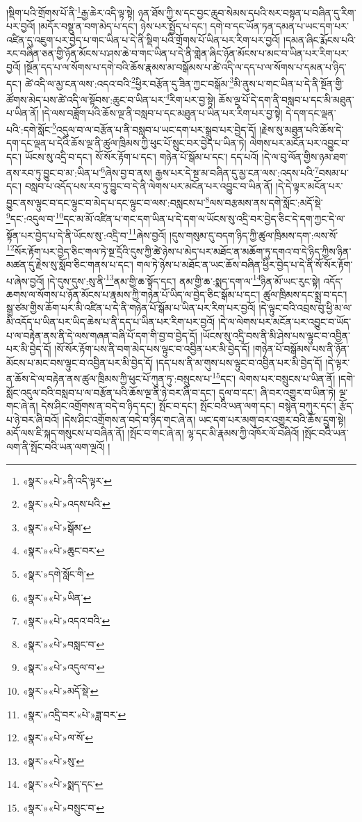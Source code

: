 །སྡིག་པའི་གྲོགས་པོ་ནི་\footnote{«སྣར་»«པེ་»ནི་འདི་ལྟར་}རྒྱ་ཆེར་འདི་ལྟ་སྟེ། ཉན་ཐོས་ཀྱི་ས་དང་བྱང་ཆུབ་སེམས་དཔའི་སར་བསྟན་པ་བཞིན་དུ་རིག་པར་བྱའོ། །མདོར་བསྡུ་ན་བག་མེད་པ་དང་། ཉེས་པར་སྤྱོད་པ་དང་། དགེ་བ་དང་ཡོན་ཏན་དམན་པ་ཡང་དག་པར་འཛིན་དུ་འཇུག་པར་བྱེད་པ་གང་ཡིན་པ་དེ་ནི་སྡིག་པའི་གྲོགས་པོ་ཡིན་པར་རིག་པར་བྱའོ། །དམན་ཞིང་རྨོངས་པའི་རང་བཞིན་ཅན་གྱི་ཉོན་མོངས་པ་ཤས་ཆེ་བ་གང་ཡིན་པ་དེ་ནི་གླེན་ཞིང་ཉོན་མོངས་པ་མང་བ་ཡིན་པར་རིག་པར་བྱའོ། །སྔོན་དད་པ་ལ་སོགས་པ་དགེ་བའི་ཆོས་རྣམས་མ་བསྒོམས་པ་ཚེ་འདི་ལ་དད་པ་ལ་སོགས་པ་དམན་པ་ཉིད་དང་། ཚེ་འདི་ལ་མྱ་ངན་ལས་:འདའ་བའི་\footnote{«སྣར་»«པེ་»འདས་པའི་}ཕྱིར་བརྩོན་དུ་ཟིན་ཀྱང་བསྒོམ་\footnote{«སྣར་»«པེ་»སྒོམ་}མི་ནུས་པ་གང་ཡིན་པ་དེ་ནི་སྔོན་གྱི་ཚོགས་མེད་པས་ཚེ་འདི་ལ་སྟོབས་:ཆུང་བ་ཡིན་པར་\footnote{«སྣར་»«པེ་»ཆུང་བར་}རིག་པར་བྱ་སྟེ། ཆོས་ལྔ་པོ་དེ་དག་ནི་བསླབ་པ་དང་མི་མཐུན་པ་ཡིན་ནོ། །དེ་ལས་བཟློག་པའི་ཆོས་ལྔ་ནི་བསླབ་པ་དང་མཐུན་པ་ཡིན་པར་རིག་པར་བྱ་སྟེ། དེ་དག་དང་ལྡན་པའི་:དགེ་སློང་\footnote{«སྣར་»དགེ་སློང་གི་}འདུལ་བ་ལ་བརྩོན་པ་ནི་བསླབ་པ་ཡང་དག་པར་སྒྲུབ་པར་བྱེད་དོ། །རྗེས་སུ་མཐུན་པའི་ཆོས་དེ་དག་དང་ལྡན་པ་དེའི་ཆོས་ལྔ་ནི་ཚུལ་ཁྲིམས་ཀྱི་ཕུང་པོ་སྲུང་བར་བྱེད་པ་ཡིན་ཏེ། ལེགས་པར་མངོན་པར་འབྱུང་བ་དང་། ཡོངས་སུ་འདྲི་བ་དང་། སོ་སོར་རྟོག་པ་དང་། གཉེན་པོ་སྒོམ་པ་དང་། དད་པའོ། །དེ་ལ་བུ་ལོན་གྱིས་ཉམ་ཐག་ནས་རབ་ཏུ་བྱུང་བ་མ་:ཡིན་པ་\footnote{«སྣར་»«པེ་»ཡིན་}ཞེས་བྱ་བ་ནས། རྒྱས་པར་དེ་སྔ་མ་བཞིན་དུ་མྱ་ངན་ལས་:འདས་པའི་\footnote{«སྣར་»«པེ་»འདའ་བའི་}བསམ་པ་དང་། བསླབ་པ་འདོད་པས་རབ་ཏུ་བྱུང་བ་དེ་ནི་ལེགས་པར་མངོན་པར་འབྱུང་བ་ཡིན་ནོ། །དེ་དེ་ལྟར་མངོན་པར་བྱུང་ནས་ལྟུང་བ་དང་ལྟུང་བ་མེད་པ་དང་ལྟུང་བ་ལས་:བསླངས་པ་\footnote{«སྣར་»«པེ་»བསླང་བ་}ལས་བརྩམས་ནས་དགེ་སློང་:མདོ་སྡེ་\footnote{«སྣར་»«པེ་»འདུལ་བ་}དང་:འདུལ་བ་\footnote{«སྣར་»«པེ་»མདོ་སྡེ་}དང་མ་མོ་འཛིན་པ་གང་དག་ཡིན་པ་དེ་དག་ལ་ཡོངས་སུ་འདྲི་བར་བྱེད་ཅིང་དེ་དག་ཀྱང་དེ་ལ་སྟོན་པར་བྱེད་པ་དེ་ནི་ཡོངས་སུ་:འདྲི་བ་\footnote{«སྣར་»འདྲི་བར་«པེ་»ཟླ་བར་}ཞེས་བྱའོ། །དུས་གསུམ་དུ་བདག་ཉིད་ཀྱི་ཚུལ་ཁྲིམས་དག་:ལས་སོ་\footnote{«སྣར་»«པེ་»ལ་སོ་}སོར་རྟོག་པར་བྱེད་ཅིང་གལ་ཏེ་སྔ་དྲོའི་དུས་ཀྱི་ཚེ་ཉེས་པ་མེད་པར་མཐོང་ན་མཆོག་ཏུ་དགའ་བ་དེ་ཉིད་ཀྱིས་ཉིན་མཚན་དུ་རྗེས་སུ་སློབ་ཅིང་གནས་པ་དང་། གལ་ཏེ་ཉེས་པ་མཐོང་ན་ཡང་ཆོས་བཞིན་ཕྱིར་བྱེད་པ་དེ་ནི་སོ་སོར་རྟོག་པ་ཞེས་བྱའོ། །དེ་དུས་དུས་:སུ་ནི་\footnote{«སྣར་»«པེ་»སུ་}ནམ་གྱི་ཆ་སྟོད་དང་། ནམ་གྱི་ཆ་:སྨད་དག་ལ་\footnote{«སྣར་»«པེ་»སྨད་དང་}ཉིན་མོ་ཡང་རུང་སྟེ། འདོད་ཆགས་ལ་སོགས་པ་ཉོན་མོངས་པ་རྣམས་ཀྱི་གཉེན་པོ་ཡིད་ལ་བྱེད་ཅིང་སྒོམ་པ་དང་། ཚུལ་ཁྲིམས་དང་སྨྲ་བ་དང་། སྒྲ་ཙམ་གྱིས་ཆོག་པར་མི་འཛིན་པ་དེ་ནི་གཉེན་པོ་སྒོམ་པ་ཡིན་པར་རིག་པར་བྱའོ། །དེ་ལྟུང་བའི་འབྲས་བུ་ཕྱི་མ་ལ་མི་འདོད་པ་ཡིན་པར་ཡིད་ཆེས་པ་ནི་དད་པ་ཡིན་པར་རིག་པར་བྱའོ། །དེ་ལ་ལེགས་པར་མངོན་པར་འབྱུང་བ་ཡོད་པ་ལ་བརྟེན་ནས་ནི་དེ་ལས་གཞན་བཞི་པོ་དག་གི་བྱ་བ་བྱེད་དོ། །ཡོངས་སུ་འདྲི་བས་ནི་མི་ཤེས་པས་ལྟུང་བ་འབྱིན་པར་མི་བྱེད་དོ། །སོ་སོར་རྟོག་པས་ནི་བག་མེད་པས་ལྟུང་བ་འབྱིན་པར་མི་བྱེད་དོ། །གཉེན་པོ་བསྒོམས་པས་ནི་ཉོན་མོངས་པ་མང་བས་ལྟུང་བ་འབྱིན་པར་མི་བྱེད་དོ། །དད་པས་ནི་མ་གུས་པས་ལྟུང་བ་འབྱིན་པར་མི་བྱེད་དོ། །དེ་ལྟར་ན་ཆོས་དེ་ལ་བརྟེན་ནས་ཚུལ་ཁྲིམས་ཀྱི་ཕུང་པོ་ཀུན་ཏུ་:བསྲུངས་པ་\footnote{«སྣར་»«པེ་»བསྲུང་བ་}དང་། ལེགས་པར་བསྲུངས་པ་ཡིན་ནོ། །དགེ་སློང་འདུལ་བའི་བསླབ་པ་ལ་བརྩོན་པའི་ཆོས་ལྔ་ནི་ཉེ་བར་ཞི་བ་དང་། དུལ་བ་དང་། ཞི་བར་འགྱུར་བ་ཡིན་ཏེ། ལྔ་གང་ཞེ་ན། དེས་ཤིང་འགྲོགས་ན་བདེ་བ་ཉིད་དང་། སྤོང་བ་དང་། སྤོང་བའི་ཡན་ལག་དང་། བསྙེན་བཀུར་དང་། རྩོད་པ་ཉེ་བར་ཞི་བའོ། །དེས་ཤིང་འགྲོགས་ན་བདེ་བ་ཉིད་གང་ཞེ་ན། ཡང་དག་པར་མགུ་བར་འགྱུར་བའི་ཆོས་དྲུག་སྟེ། མདོ་ལས་ཇི་སྐད་གསུངས་པ་བཞིན་ནོ། །སྤོང་བ་གང་ཞེ་ན། ལྷ་དང་མི་རྣམས་ཀྱི་འཁོར་ལོ་བཞིའོ། །སྤོང་བའི་ཡན་ལག་ནི་སྤོང་བའི་ཡན་ལག་ལྔའོ། །

